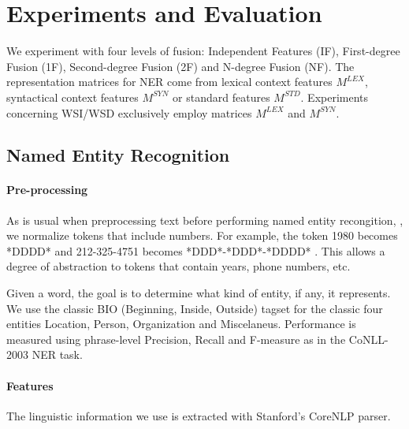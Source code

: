 \documentclass[11pt]{article}
\begin{document}
\section{Experiments and Evaluation}


We experiment with four levels of fusion: Independent Features (IF), First-degree Fusion (1F), Second-degree Fusion (2F) and N-degree Fusion (NF). The representation matrices for NER come from lexical context features $M^{LEX}$, syntactical context features $M^{SYN}$ or standard features $M^{STD}$.  Experiments concerning WSI/WSD exclusively employ matrices $M^{LEX}$ and $M^{SYN}$.

\subsection{Named Entity Recognition}

\paragraph{Pre-processing}

As is usual when preprocessing text before performing named entity recongition, \cite{RatinovR09}, we normalize tokens that include numbers. For example, the token 1980 becomes *DDDD* and 212-325-4751 becomes *DDD*-*DDD*-*DDDD* . This allows a degree of abstraction to tokens that contain years, phone
numbers, etc.

Given a word, the goal is to determine what kind of entity, if any, it represents. We use the classic BIO (Beginning, Inside, Outside) tagset for the classic four entities Location, Person, Organization and Miscelaneus. Performance is measured using phrase-level Precision, Recall and F-measure as in the CoNLL-2003 NER task.
\paragraph{Features}
The linguistic information we use is extracted with Stanford’s CoreNLP parser.
\end{document}

